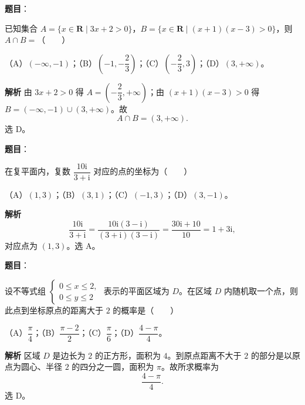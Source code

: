 
\begin{answer}

\textbf{题目}：

已知集合 $A=\{x\in\mathbf R\mid3x+2>0\}$，$B=\{x\in\mathbf R\mid(x+1)(x-3)>0\}$，则 $A\cap B=$\mbox{（　　）}

（A）$(-\infty,-1)$；（B）$\left(-1,-\dfrac23\right)$；（C）$\left(-\dfrac23,3\right)$；（D）$(3,+\infty)$。

\textbf{解析}
由 $3x+2>0$ 得 $A=\left(-\dfrac23,+\infty\right)$；由 $(x+1)(x-3)>0$ 得 $B=(-\infty,-1)\cup(3,+\infty)$。故
\nopagebreak[4]
\[A\cap B=(3,+\infty).\]
选 D。


\end{answer}
\begin{answer}

\textbf{题目}：

在复平面内，复数 $\dfrac{10\mathrm i}{3+\mathrm i}$ 对应的点的坐标为\mbox{（　　）}

（A）$(1,3)$；（B）$(3,1)$；（C）$(-1,3)$；（D）$(3,-1)$。

\textbf{解析}
\nopagebreak[4]
\[\frac{10\mathrm i}{3+\mathrm i}=\frac{10\mathrm i(3-\mathrm i)}{(3+\mathrm i)(3-\mathrm i)}=\frac{30\mathrm i+10}{10}=1+3\mathrm i,\]
对应点为 $(1,3)$。选 A。


\end{answer}
\begin{answer}

\textbf{题目}：

设不等式组 $\begin{cases}0\leqslant x\leqslant2,\\0\leqslant y\leqslant2\end{cases}$ 表示的平面区域为 $D$。在区域 $D$ 内随机取一个点，则此点到坐标原点的距离大于 $2$ 的概率是\mbox{（　　）}

（A）$\dfrac\pi4$；（B）$\dfrac{\pi-2}2$；（C）$\dfrac\pi6$；（D）$\dfrac{4-\pi}4$。

\textbf{解析}
区域 $D$ 是边长为 $2$ 的正方形，面积为 $4$。到原点距离不大于 $2$ 的部分是以原点为圆心、半径 $2$ 的四分之一圆，面积为 $\pi$。故所求概率为
\nopagebreak[4]
\[\frac{4-\pi}4.\]
选 D。


\end{answer}
